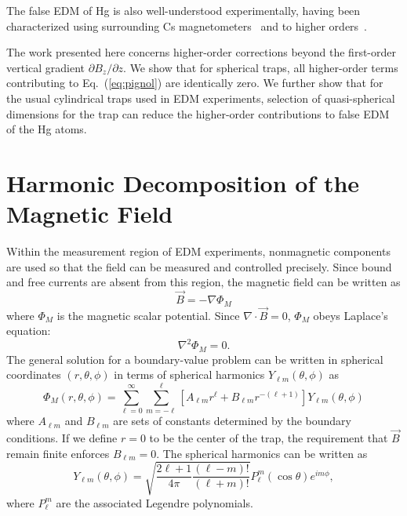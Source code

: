 \documentclass[preprint,12pt]{elsarticle}
\begin{document}
The false EDM of Hg is also well-understood experimentally, having
been characterized using surrounding Cs magnetometers~\cite{bib:hgcs}
and to higher orders~\cite{bib:komposch}.

The work presented here concerns higher-order corrections beyond the
first-order vertical gradient $\partial B_{z}/\partial z$.  We show
that for spherical traps, all higher-order terms contributing to
Eq.~(\ref{eq:pignol}) are identically zero.  We further show that for
the usual cylindrical traps used in EDM experiments, selection of
quasi-spherical dimensions for the trap can reduce the higher-order
contributions to false EDM of the Hg atoms.


\section{Harmonic Decomposition of the Magnetic Field}

Within the measurement region of EDM experiments, nonmagnetic
components are used so that the field can be measured and controlled
precisely.  Since bound and free currents are absent from this region,
the magnetic field can be written as
\begin{equation}
\vec{B}=-\nabla\Phi_M
\end{equation}
where $\Phi_M$ is the magnetic scalar potential.  Since
$\nabla\cdot\vec{B}=0$, $\Phi_M$ obeys Laplace's equation:
\begin{equation}
\nabla^2\Phi_M=0.
\end{equation}
The general solution for a boundary-value problem can be written in
spherical coordinates $(r,\theta,\phi)$ in terms of spherical
harmonics $Y_{\ell m}(\theta,\phi)$ as~\cite{bib:jackson}
\begin{equation}\label{eq:boundaryvalue}
  \Phi_M(r,\theta,\phi)=\sum_{\ell=0}^\infty\sum_{m=-\ell}^\ell\left[A_{\ell m}r^\ell+B_{\ell m}r^{-(\ell+1)}\right]Y_{\ell m}(\theta,\phi)
\end{equation}
where $A_{\ell m}$ and $B_{\ell m}$ are sets of constants determined
by the boundary conditions.  If we define $r=0$ to be the center of
the trap, the requirement that $\vec{B}$ remain finite enforces
$B_{\ell m}=0$.  The spherical harmonics can be written as
\begin{equation}
    Y_{\ell m}(\theta,\phi)=\sqrt{\frac{2\ell+1}{4\pi}\frac{(\ell-m)!}{(\ell+m)!}}P_{\ell}^{m}(\cos\theta)e^{im\phi},
\end{equation}
where $P_{\ell}^{m}$ are the associated Legendre polynomials.  
\end{document}
